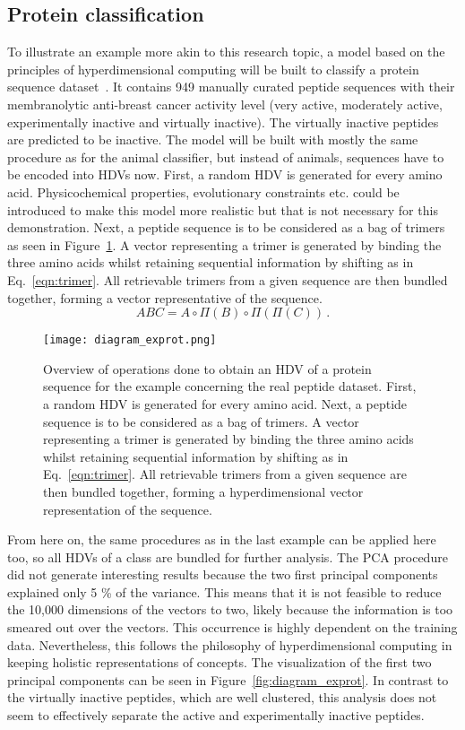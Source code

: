 \subsection*{Protein classification}
\label{ssec:protclas}
To illustrate an example more akin to this research topic, a model based on the principles of hyperdimensional computing will be built to classify a protein sequence dataset~\cite{anticancer}. It contains 949 manually curated peptide sequences with their membranolytic anti-breast cancer activity level (very active, moderately active, experimentally inactive and virtually inactive). The virtually inactive peptides are predicted to be inactive. The model will be built with mostly the same procedure as for the animal classifier, but instead of animals, sequences have to be encoded into HDVs now. First, a random HDV is generated for every amino acid. Physicochemical properties, evolutionary constraints etc. could be introduced to make this model more realistic but that is not necessary for this demonstration. Next, a peptide sequence is to be considered as a bag of trimers as seen in Figure~\ref{fig:diagram_exprot5}. A vector representing a trimer is generated by binding the three amino acids whilst retaining sequential information by shifting as in Eq.~\ref{eqn:trimer}. All retrievable trimers from a given sequence are then bundled together, forming a vector representative of the sequence. 
\begin{equation}\label{eqn:trimer}
    ABC = A \circ \Pi (B) \circ \Pi (\Pi (C))\,.
\end{equation}
\begin{figure}[h!]
    \centering
    \texttt{[image: diagram\_exprot.png]}
    \caption{Overview of operations done to obtain an HDV of a protein sequence for the example concerning the real peptide dataset. First, a random HDV is generated for every amino acid. Next, a peptide sequence is to be considered as a bag of trimers. A vector representing a trimer is generated by binding the three amino acids whilst retaining sequential information by shifting as in Eq.~\ref{eqn:trimer}. All retrievable trimers from a given sequence are then bundled together, forming a hyperdimensional vector representation of the sequence.}
    \label{fig:diagram_exprot5}
\end{figure}
From here on, the same procedures as in the last example can be applied here too, so all HDVs of a class are bundled for further analysis. The PCA procedure did not generate interesting results because the two first principal components explained only 5 \% of the variance. This means that it is not feasible to reduce the 10,000 dimensions of the vectors to two, likely because the information is too smeared out over the vectors. This occurrence is highly dependent on the training data. Nevertheless, this follows the philosophy of hyperdimensional computing in keeping holistic representations of concepts. The visualization of the first two principal components can be seen in Figure~\ref{fig:diagram_exprot}. In contrast to the virtually inactive peptides, which are well clustered, this analysis does not seem to effectively separate the active and experimentally inactive peptides.

